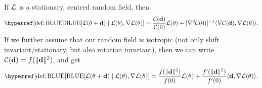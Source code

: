 \begin{lemma}
	If \(\mathcal{L}\) is a stationary, centred random field, then
	\begin{align*}
		\BLUE[\Loss(\param + \step)\mid \Loss(\param), \nabla\Loss(\param)]
		= \frac{\C(\step)}{\C(0)} \Loss(\param)
		+ [\nabla^2\C(0)]^{-1} \langle \nabla \C(\step), \nabla\Loss(\param)\rangle.
	\end{align*}
	If we further assume that our random field is isotropic (not only shift
	invariant/stationary, but also rotation invariant), then we can
	write \(\mathcal{C}(\mathbf{d})=f(\|\mathbf{d}\|^2)\), and get
	\begin{align*}
		\BLUE[\Loss(\param + \step)\mid \Loss(\param), \nabla\Loss(\param)]
		= \frac{f(\|\step\|^2)}{f(0)} \Loss(\param)
		+ \frac{f'(\|\step\|^2)}{f'(0)} \langle \step, \nabla\Loss(\param)\rangle.
	\end{align*}
\end{lemma}
